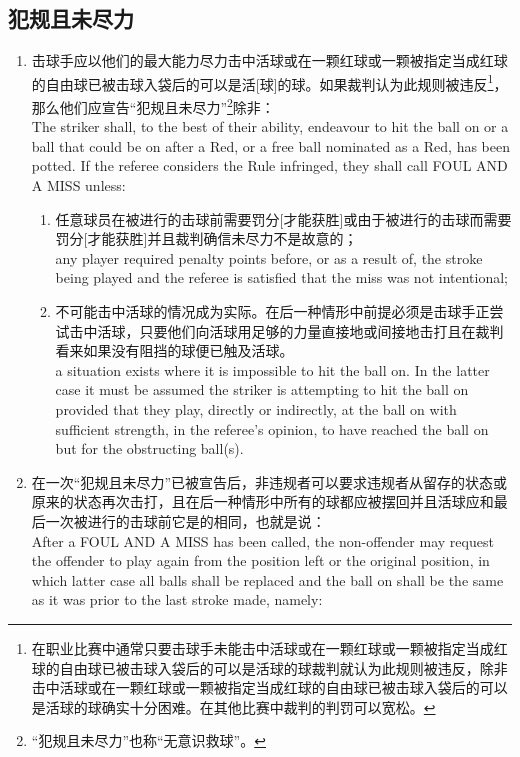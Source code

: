 \subsection{犯规且未尽力}\label{22314}

\begin{enumerate}[label=(\alph*)]
    \item \label{22314a}击球手应以他们的最大能力尽力击中活球或在一颗红球或一颗被指定当成红球的自由球已被击球入袋后的可以是活[球]的球。如果裁判认为此规则被违反\footnote{在职业比赛中通常只要击球手未能击中活球或在一颗红球或一颗被指定当成红球的自由球已被击球入袋后的可以是活球的球裁判就认为此规则被违反，除非击中活球或在一颗红球或一颗被指定当成红球的自由球已被击球入袋后的可以是活球的球确实十分困难。在其他比赛中裁判的判罚可以宽松。}，那么他们应宣告``犯规且未尽力''\footnote{``犯规且未尽力''也称``无意识救球''。}除非：\\
    The striker shall, to the best of their ability, endeavour to hit the ball on or a ball that could be on after a Red, or a free ball nominated as a Red, has been potted. If the referee considers the Rule infringed, they shall call FOUL AND A MISS unless:
    \begin{enumerate}[label=(\roman*)]
        \item \label{22314ai}任意球员在被进行的击球前需要罚分[才能获胜]或由于被进行的击球而需要罚分[才能获胜]并且裁判确信未尽力不是故意的；\\
        any player required penalty points before, or as a result of, the stroke being played and the referee is satisfied that the miss was not intentional;
        \item 不可能击中活球的情况成为实际。在后一种情形中前提必须是击球手正尝试击中活球，只要他们向活球用足够的力量直接地或间接地击打且在裁判看来如果没有阻挡的球便已触及活球。\\
        a situation exists where it is impossible to hit the ball on. In the latter case it must be assumed the striker is attempting to hit the ball on provided that they play, directly or indirectly, at the ball on with sufficient strength, in the referee's opinion, to have reached the ball on but for the obstructing ball(s).
    \end{enumerate}
    \item \label{22314b}在一次``犯规且未尽力''已被宣告后，非违规者可以要求违规者从留存的状态或原来的状态再次击打，且在后一种情形中所有的球都应被摆回并且活球应和最后一次被进行的击球前它是的相同，也就是说：\\
    After a FOUL AND A MISS has been called, the non-offender may request the offender to play again from the position left or the original position, in which latter case all balls shall be replaced and the ball on shall be the same as it was prior to the last stroke made, namely:

\end{enumerate}
